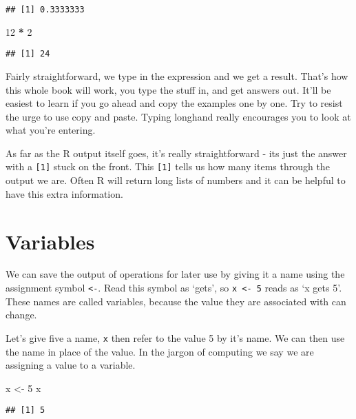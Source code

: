 \documentclass[
]{book}
\newenvironment{Shaded}{\begin{snugshade}}{\end{snugshade}}
\newcommand{\DecValTok}[1]{\textcolor[rgb]{0.00,0.00,0.81}{#1}}
\newcommand{\NormalTok}[1]{#1}
\newcommand{\OperatorTok}[1]{\textcolor[rgb]{0.81,0.36,0.00}{\textbf{#1}}}
\newcommand{\StringTok}[1]{\textcolor[rgb]{0.31,0.60,0.02}{#1}}
\begin{document}
\begin{verbatim}
## [1] 0.3333333
\end{verbatim}

\begin{Shaded}
\begin{Highlighting}[]
 \DecValTok{12} \OperatorTok{*}\StringTok{ }\DecValTok{2}
\end{Highlighting}
\end{Shaded}

\begin{verbatim}
## [1] 24
\end{verbatim}

Fairly straightforward, we type in the expression and we get a result. That's how this whole book will work, you type the stuff in, and get answers out. It'll be easiest to learn if you go ahead and copy the examples one by one. Try to resist the urge to use copy and paste. Typing longhand really encourages you to look at what you're entering.

As far as the R output itself goes, it's really straightforward - its just the answer with a \texttt{{[}1{]}} stuck on the front. This \texttt{{[}1{]}} tells us how many items through the output we are. Often R will return long lists of numbers and it can be helpful to have this extra information.

\hypertarget{variables}{%
\section{Variables}\label{variables}}

We can save the output of operations for later use by giving it a name using the assignment symbol \texttt{\textless{}-}. Read this symbol as `gets', so \texttt{x\ \textless{}-\ 5} reads as `x gets 5'. These names are called variables, because the value they are associated with can change.

Let's give five a name, \texttt{x} then refer to the value 5 by it's name. We can then use the name in place of the value. In the jargon of computing we say we are assigning a value to a variable.

\begin{Shaded}
\begin{Highlighting}[]
\NormalTok{ x <-}\StringTok{ }\DecValTok{5}
\NormalTok{ x}
\end{Highlighting}
\end{Shaded}

\begin{verbatim}
## [1] 5
\end{verbatim}
\end{document}
